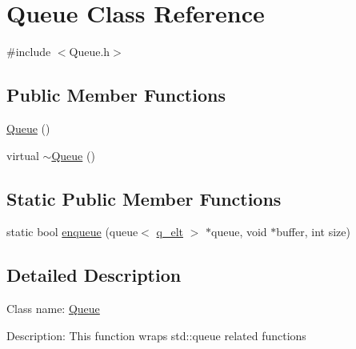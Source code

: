 \hypertarget{class_queue}{\section{\-Queue \-Class \-Reference}
\label{d4/da4/class_queue}
}


{\ttfamily \#include $<$\-Queue.\-h$>$}

\subsection*{\-Public \-Member \-Functions}
\begin{DoxyCompactItemize}
\item 
\hyperlink{class_queue_a7cfca3637d57c4a9e37351b3426ffd40}{\-Queue} ()
\item 
virtual \hyperlink{class_queue_a278ca5bea2aca00f02d17892604b5012}{$\sim$\-Queue} ()
\end{DoxyCompactItemize}
\subsection*{\-Static \-Public \-Member \-Functions}
\begin{DoxyCompactItemize}
\item 
static bool \hyperlink{class_queue_ae5ad57305adbae74caedbfadefe6c643}{enqueue} (queue$<$ \hyperlink{classq__elt}{q\-\_\-elt} $>$ $\ast$queue, void $\ast$buffer, int size)
\end{DoxyCompactItemize}


\subsection{\-Detailed \-Description}
\-Class name\-: \hyperlink{class_queue}{\-Queue}

\-Description\-: \-This function wraps std\-::queue related functions 


